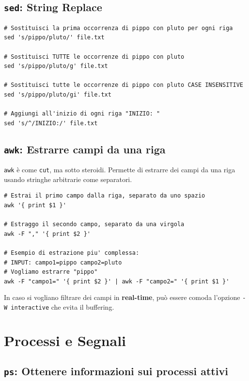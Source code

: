 \documentclass[a4paper]{report}
\newenvironment{info}{\begin{tcolorbox}[fonttitle=\sffamily\bfseries\large,title=Info,colframe=blue!75!white]}{\end{tcolorbox}}
\newenvironment{code}{\begin{tcolorbox}[size=small]}{\end{tcolorbox}}
\begin{document}
\section{\texttt{sed}: String Replace}
\begin{code}
\begin{lstlisting}
# Sostituisci la prima occorrenza di pippo con pluto per ogni riga
sed 's/pippo/pluto/' file.txt

# Sostituisci TUTTE le occorrenze di pippo con pluto
sed 's/pippo/pluto/g' file.txt

# Sostituisci tutte le occorrenze di pippo con pluto CASE INSENSITIVE
sed 's/pippo/pluto/gi' file.txt

# Aggiungi all'inizio di ogni riga "INIZIO: "
sed 's/^/INIZIO:/' file.txt
\end{lstlisting}
\end{code}

\section{\texttt{awk}: Estrarre campi da una riga}

\texttt{awk} è come \texttt{cut}, ma sotto steroidi. Permette di estrarre dei campi da una riga usando stringhe arbitrarie come separatori.

\begin{code}
\begin{lstlisting}
# Estrai il primo campo dalla riga, separato da uno spazio
awk '{ print $1 }'

# Estraggo il secondo campo, separato da una virgola
awk -F "," '{ print $2 }'

# Esempio di estrazione piu' complessa:
# INPUT: campo1=pippo campo2=pluto
# Vogliamo estrarre "pippo"
awk -F "campo1=" '{ print $2 }' | awk -F "campo2=" '{ print $1 }'
\end{lstlisting}
\end{code}

\begin{info}
	In caso si vogliano filtrare dei campi in \textbf{real-time}, può essere comoda l'opzione \texttt{-W interactive} che evita il buffering.
\end{info}

\chapter{Processi e Segnali}

\section{\texttt{ps}: Ottenere informazioni sui processi attivi}
\end{document}
